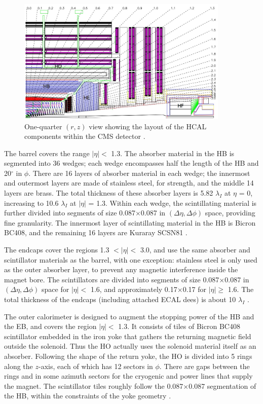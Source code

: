 \begin{figure}[htb]
\centering
\includegraphics[width=0.9\textwidth]{figures/hcal-layout.jpg}
\caption[One-quarter $(r,z)$ view showing the layout of the HCAL components within the
CMS detector.]{One-quarter $(r,z)$ view showing the layout of the HCAL components within the
  CMS detector \cite{cms}.}
\label{fig:cms:hcal}
\end{figure}

The barrel covers the range $|\eta| <$ 1.3. The absorber material in
the HB is segmented into 36 wedges; each wedge encompasses half the
length of the HB and 20$^\circ$ in $\phi$. There are 16 layers of
absorber material in each wedge; the innermost and outermost layers are
made of stainless steel, for strength, and the middle 14 layers are
brass. The total thickness of these absorber layers is 5.82
$\lambda_I$ at $\eta$ = 0, increasing to 10.6 $\lambda_I$ at $|\eta|$
= 1.3. Within each wedge, the scintillating material is further
divided into segments of size 0.087$\times$0.087 in $(\Delta\eta,\Delta\phi)$
space, providing fine granularity. The innermost layer of
scintillating material in the HB is Bicron BC408, and the remaining 16
layers are Kuraray SCSN81 \cite{accelexper}.

The endcaps cover the regions 1.3 $< |\eta| <$ 3.0, and use the same
absorber and scintillator materials as the barrel, with one exception:
stainless steel is only used as the outer absorber layer, to
prevent any magnetic interference inside the magnet bore. The
scintillators are divided into segments of size 0.087$\times$0.087 in
$(\Delta\eta,\Delta\phi)$ space for $|\eta| <$ 1.6, and approximately
0.17$\times$0.17 for $|\eta| \geq$ 1.6. The total thickness of the
endcaps (including attached ECAL dees) is about 10 $\lambda_I$
\cite{accelexper}.

The outer calorimeter is designed to augment the stopping power of the
HB and the EB, and covers the region $|\eta| <$ 1.3. It consists of
tiles of Bicron BC408 scintillator embedded in the iron yoke that
gathers the returning magnetic field outside the solenoid. Thus the HO
actually uses the solenoid material itself as an absorber.
Following the shape of the return yoke, the HO is divided into 5 rings
along the $z$-axis, each of which has 12 sectors in $\phi$. There are
gaps between the rings and in some azimuth sectors for the cryogenic
and power lines that supply the magnet. The scintillator tiles roughly
follow the 0.087$\times$0.087 segmentation of the HB, within the
constraints of the yoke geometry \cite{accelexper}.

